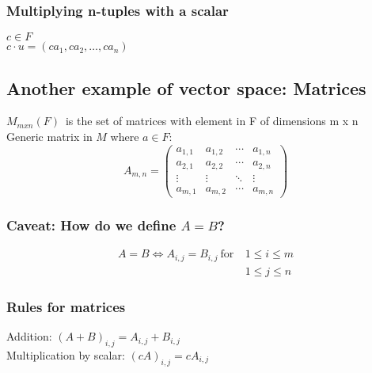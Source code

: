 \documentclass[a4paper]{article}
\begin{document}
\subsubsection{Multiplying n-tuples with a scalar}
$c \in F$\\
$c \cdot u = (ca_1, ca_2,\dots, ca_n) $

\subsection{Another example of vector space: Matrices}
$M_{mxn}(F)$\ is the set of matrices with element in F of dimensions m x n\\
Generic matrix in $M$ where $a \in F$:
\begin{equation*}
A_{m,n} = 
\begin{pmatrix}
a_{1,1} & a_{1,2} & \cdots & a_{1,n} \\
a_{2,1} & a_{2,2} & \cdots & a_{2,n} \\
\vdots  & \vdots  & \ddots & \vdots  \\
a_{m,1} & a_{m,2} & \cdots & a_{m,n} 
\end{pmatrix}
\end{equation*}

\subsubsection{Caveat: How do we define $A = B$?}
\begin{equation*}
\begin{split}
	A = B \Leftrightarrow A_{i,j} = B_{i,j} \ \text{for} \ & 1 \leq i \leq m\\
													   & 1 \leq j \leq n
\end{split}
\end{equation*}

\subsubsection{Rules for matrices}
Addition: $(A + B)_{i,j} = A_{i,j} + B_{i,j}$\\
Multiplication by scalar: $(cA)_{i,j} = cA_{i,j}$
\end{document}
